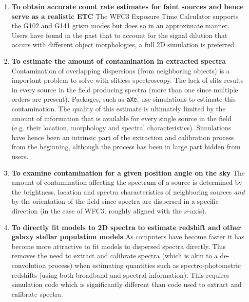 \documentclass[preprint]{aastex}
\begin{document}
\begin{enumerate}
\item {\bf To obtain accurate count rate estimates for faint sources and hence serve as a realistic ETC}
The WFC3 Exposure Time Calculator supports the G102 and G141 grism modes but does so in an approximate manner. Users have found in the past that to account for the signal dilution that occurs with different object morphologies, a full 2D simulation is preferred. 


\item {\bf To estimate the amount of contamination in extracted spectra}
Contamination of overlapping dispersions (from neighboring objects) is a important problem to solve with slitless spectroscopy. The lack of slits results in every source in the field producing spectra (more than one since multiple orders are present). Packages, such as \texttt{aXe}, use simulations to estimate this contamination. The quality of this estimate is ultimately limited by the amount of information that is available for every single source in the field (e.g. their location, morphology and spectral characteristics). Simulations have hence been an intrinsic part of the extraction and calibration process from the beginning, although the process has been in large part hidden from users.

\item {\bf To examine contamination for a given position angle on the sky}
The amount of contamination affecting  the spectrum of a source is determined by the brightness, location and spectra characteristics of neighboring sources {\em and} by the orientation of the field since spectra are dispersed in a specific direction (in the case of WFC3, roughly aligned with the $x$-axis).

\item {\bf To directly fit models to 2D spectra to estimate redshift and other galaxy stellar population models}
As computers have become faster it has become more attractive to fit models to dispersed spectra directly. This removes the need to extract and calibrate spectra (which is akin to a de-convolution process) when estimating quantities such as spectro-photometric redshifts (using both broadband and spectral information). This requires simulation code which is significantly different than code used to extract and calibrate spectra.

\end{enumerate}


\end{document}
